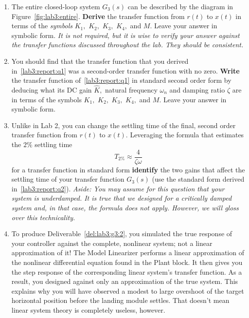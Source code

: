 \begin{deliverable}[label={lab3:report}]
  \begin{enumerate}[label={(\arabic*)}]
    \item{%
      The entire closed-loop system \(G_3(s)\) can be described by the diagram in Figure~\ref{fig:lab3:entire}.
      \textbf{Derive} the transfer function from \(r(t)\) to \(x(t)\)
      in terms of the \emph{symbols} \(K_1,\) \(K_2,\) \(K_3,\) \(K_4,\) and \(M.\)
      Leave your answer in symbolic form.
      \emph{It is not required, but it is wise to verify your answer against the transfer functions discussed throughout the lab. They should be consistent.}
      \label{lab3:report:q1}    
    }
    \item{%
      You should find that the transfer function that you derived in~\ref{lab3:report:q1} was a second-order transfer function with no zero.
      \textbf{Write} the transfer function of~\ref{lab3:report:q1} in standard second order form by deducing what its DC gain \(\hat{K},\) natural frequency \(\omega_n\) and damping ratio \(\zeta\) are in terms of the symbols \(K_1,\) \(K_2,\) \(K_3,\) \(K_4,\) and \(M.\)
      Leave your answer in symbolic form.
      \label{lab3:report:q2}
    }
    \item{%
      Unlike in Lab 2, you can change the settling time of the final, second order transfer function from \(r(t)\) to \(x(t).\)
      Leveraging the formula that estimates the \(2\%\) settling time
      \[
        T_{2\%} \approx \frac{4}{\zeta \omega}
      \]
      for a transfer function in standard form \textbf{identify} the two gains that affect the settling time of your transfer function \(G_3(s)\) (use the standard form derived in~\ref{lab3:report:q2}).
      \emph{Aside: You may assume for this question that your system is underdamped. It is true that we designed for a critically damped system and, in that case, the formula does not apply. However, we will gloss over this technicality.}
      \label{lab3:report:q3}
    }
    \item{%
      To produce Deliverable~\ref{del:lab3:g3:2}, you simulated the true response of your controller against the complete, nonlinear system;
      not a linear approximation of it!
      The Model Linearizer performs a linear approximation of the nonlinear differential equation found in the Plant block.
      It then gives you the step response of the corresponding linear system's transfer function.
      As a result, you designed against only an approximation of the true system.
      This explains why you will have observed a modest to large overshoot of the target horizontal position before the landing module settles.
      That doesn't mean linear system theory is completely useless, however.

}
\end{enumerate}
\end{deliverable}
